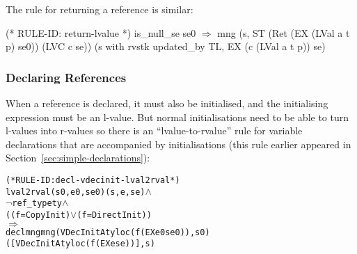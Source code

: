 \documentclass[11pt]{article}
\begin{document}
\smallskip\noindent
The rule for returning a reference  is similar:%
%
\label{rule:return-lvalue}%
\begin{stdrule}
(* RULE-ID: return-lvalue *)
     is_null_se se0
   \(\Rightarrow\)
     mng (s, ST (Ret (EX (LVal a t p) se0)) (LVC c se))
         (s with rvstk updated_by TL, EX (c (LVal a t p)) se)

\end{stdrule}

\subsubsection{Declaring References}

When a reference is declared, it must also be initialised, and the
initialising expression must be an l-value.  But normal
initialisations need to be able to turn l-values into r-values so
there is an ``lvalue-to-rvalue'' rule for variable declarations that
are accompanied by initialisations (this rule earlier appeared in
Section~\ref{sec:simple-declarations}):
\begin{center}
\begin{minipage}{\textwidth}
%
\begin{alltt}
(* RULE-ID: decl-vdecinit-lval2rval *)
     lval2rval (s0,e0,se0) (s,e,se) \(\land\)
     \(\neg\)ref_type ty \(\land\)
     ((f = CopyInit) \(\lor\) (f = DirectInit))
   \(\Rightarrow\)
     declmng mng (VDecInitA ty loc (f (EX e0 se0)), s0)
                 ([VDecInitA ty loc (f (EX e se))], s)
\end{alltt}
  \end{minipage}
\end{center}
\end{document}
